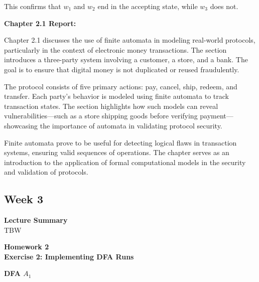 \documentclass{article}
\theoremstyle{theorem}
\theoremstyle{definition}
\theoremstyle{remark}
\begin{document}
This confirms that $w_1$ and $w_2$ end in the accepting state, while $w_3$ does not.


\textbf{Chapter 2.1 Report:}

Chapter 2.1 discusses the use of finite automata in modeling real-world protocols, particularly in the context of electronic money transactions. The section introduces a three-party system involving a customer, a store, and a bank. The goal is to ensure that digital money is not duplicated or reused fraudulently.

The protocol consists of five primary actions: pay, cancel, ship, redeem, and transfer. Each party's behavior is modeled using finite automata to track transaction states. The section highlights how such models can reveal vulnerabilities—such as a store shipping goods before verifying payment—showcasing the importance of automata in validating protocol security.

Finite automata prove to be useful for detecting logical flaws in transaction systems, ensuring valid sequences of operations. The chapter serves as an introduction to the application of formal computational models in the security and validation of protocols.

\subsection{Week 3}
\textbf{Lecture Summary}\\
TBW\bigskip\bigskip\bigskip\bigskip\bigskip\bigskip\bigskip\bigskip\bigskip\bigskip\bigskip\bigskip\bigskip\bigskip\bigskip\bigskip\bigskip\bigskip\bigskip\bigskip



{\textbf{{Homework 2}}}\\
\textbf{Exercise 2: Implementing DFA Runs}\\
\begin{center}
\textbf{DFA $A_1$}
\end{center}
\end{document}
